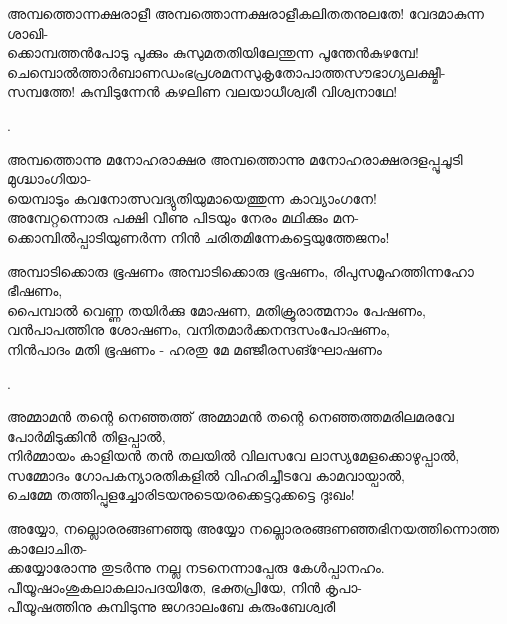 \begin{enumerate}

\begin{slokam}{\VSr}{\Mazha}{അമ്പത്തൊന്നക്ഷരാളീ}
അമ്പത്തൊന്നക്ഷരാളീകലിതതനുലതേ! വേദമാകുന്ന ശാഖി-\\
ക്കൊമ്പത്തൻപോടു പൂക്കും കുസുമതതിയിലേന്തുന്ന പൂന്തേൻകുഴമ്പേ!\\
ചെമ്പൊൽത്താർബാണഡംഭപ്രശമനസുകൃതോപാത്തസൗഭാഗ്യലക്ഷ്മീ-\\
സമ്പത്തേ! കുമ്പിടുന്നേൻ കഴലിണ വലയാധീശ്വരീ വിശ്വനാഥേ!
\end{slokam}


.

\begin{slokam}{\VSv}{\HM}{അമ്പത്തൊന്നു മനോഹരാക്ഷര}
അമ്പത്തൊന്നു മനോഹരാക്ഷരദളപ്പൂചൂടി മുഗ്ദ്ധാംഗിയാ-\\
യെമ്പാടും കവനോത്സവദ്യുതിയുമായെത്തുന്ന കാവ്യാംഗനേ!\\
അമ്പേറ്റന്നൊരു പക്ഷി വീണു പിടയും നേരം മഥിക്കും മന-\\
ക്കൊമ്പിൽപ്പാടിയുണർന്ന നിൻ ചരിതമിന്നേകട്ടെയുത്തേജനം!
\end{slokam}



\begin{slokam}{\VSv}{\Poonthanam}{അമ്പാടിക്കൊരു ഭൂഷണം}
അമ്പാടിക്കൊരു ഭൂഷണം, രിപുസമൂഹത്തിന്നഹോ ഭീഷണം,\\
പൈമ്പാല്‍ വെണ്ണ തയിര്‍ക്കു മോഷണ, മതിക്രൂരാത്മനാം പേഷണം,\\
വന്‍പാപത്തിനു ശോഷണം, വനിതമാര്‍ക്കനന്ദസംപോഷണം,\\
നിന്‍പാദം മതി ഭൂഷണം - ഹരതു മേ മഞ്ജീരസങ്ഘോഷണം
\end{slokam}


.

\begin{slokam}{\VSr}{\VKG}{അമ്മാമൻ തന്റെ നെഞ്ഞത്ത്}
അമ്മാമൻ തന്റെ നെഞ്ഞത്തമരിലമരവേ പോർമിടുക്കിൻ തിളപ്പാൽ,\\
നിർമ്മായം കാളിയൻ തൻ തലയിൽ വിലസവേ ലാസ്യമേളക്കൊഴുപ്പാൽ,\\
സമ്മോദം ഗോപകന്യാരതികളിൽ വിഹരിച്ചീടവേ കാമവായ്പാൽ,\\
ചെമ്മേ തത്തിപ്പുളച്ചോരിടയനുടെയരക്കെട്ടറുക്കട്ടെ ദുഃഖം!
\end{slokam}


\begin{slokam}{\VSv}{\VenM}{അയ്യോ, നല്ലൊരരങ്ങണഞ്ഞു}
അയ്യോ നല്ലൊരരങ്ങണഞ്ഞഭിനയത്തിന്നൊത്ത കാലോചിത-\\
ക്കയ്യോരോന്നു തുടർന്നു നല്ല നടനെന്നാപ്പേരു കേൾപ്പാനഹം.\\
പീയൂഷാംശുകലാകലാപദയിതേ, ഭക്തപ്രിയേ, നിൻ കൃപാ-\\
പീയൂഷത്തിനു കുമ്പിടുന്നു ജഗദാലംബേ കുരുംബേശ്വരീ
\end{slokam}


\end{enumerate}
